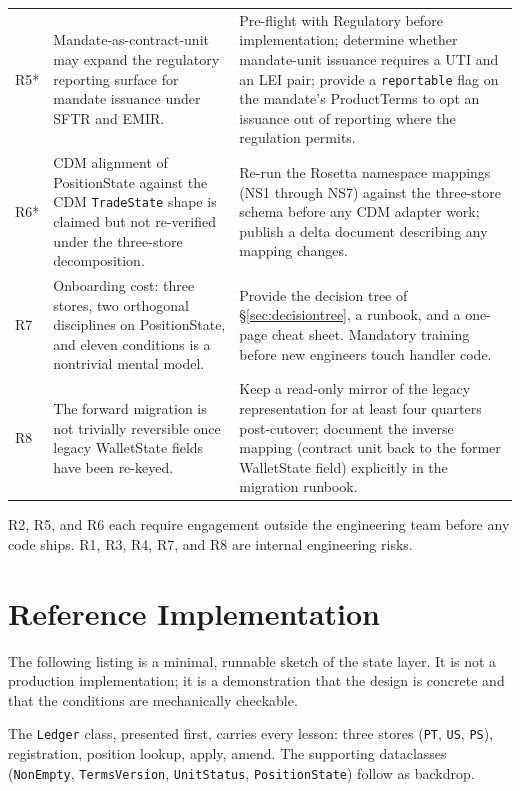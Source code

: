 \documentclass[11pt,a4paper]{article}
\begin{document}
\begin{longtable}{p{0.8cm}p{6.2cm}p{7.8cm}}
\addlinespace
R5* & Mandate-as-contract-unit may expand the regulatory reporting surface for mandate issuance under SFTR and EMIR. & Pre-flight with Regulatory before implementation; determine whether mandate-unit issuance requires a UTI and an LEI pair; provide a \texttt{reportable} flag on the mandate's ProductTerms to opt an issuance out of reporting where the regulation permits. \\
\addlinespace
R6* & CDM alignment of PositionState against the CDM \texttt{TradeState} shape is claimed but not re-verified under the three-store decomposition. & Re-run the Rosetta namespace mappings (NS1 through NS7) against the three-store schema before any CDM adapter work; publish a delta document describing any mapping changes. \\
\addlinespace
R7 & Onboarding cost: three stores, two orthogonal disciplines on PositionState, and eleven conditions is a nontrivial mental model. & Provide the decision tree of \S\ref{sec:decisiontree}, a runbook, and a one-page cheat sheet. Mandatory training before new engineers touch handler code. \\
\addlinespace
R8 & The forward migration is not trivially reversible once legacy WalletState fields have been re-keyed. & Keep a read-only mirror of the legacy representation for at least four quarters post-cutover; document the inverse mapping (contract unit back to the former WalletState field) explicitly in the migration runbook. \\
\bottomrule
\end{longtable}

\noindent R2, R5, and R6 each require engagement outside the engineering team before any code ships. R1, R3, R4, R7, and R8 are internal engineering risks.

\clearpage
\section{Reference Implementation}
\label{sec:reference}

The following listing is a minimal, runnable sketch of the state layer. It is not a production implementation; it is a demonstration that the design is concrete and that the conditions are mechanically checkable.

The \texttt{Ledger} class, presented first, carries every lesson: three stores (\texttt{PT}, \texttt{US}, \texttt{PS}), registration, position lookup, apply, amend. The supporting dataclasses (\texttt{NonEmpty}, \texttt{TermsVersion}, \texttt{UnitStatus}, \texttt{PositionState}) follow as backdrop.
\end{document}
